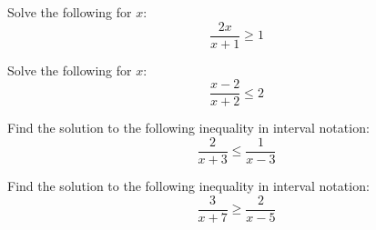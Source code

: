 \vspace{0.5em}

\begin{exercise}
Solve the following for $x$:
\[
\frac{2x}{x+1}\geq1
\]
\end{exercise}
\begin{solution}[3.5in]

\end{solution}

\begin{exercise}
Solve the following for $x$:
\[
\frac{x-2}{x+2}\leq2
\]
\end{exercise}
\begin{solution}[3.5in]

\end{solution}

\begin{exercise}
Find the solution to the following inequality in interval notation:
\[
\frac{2}{x+3}\leq\frac{1}{x-3}
\]
\end{exercise}
\begin{solution}[3.5in]

\end{solution}

\begin{exercise}
Find the solution to the following inequality in interval notation:
\[
\frac{3}{x+7}\geq\frac{2}{x-5}
\]
\end{exercise}
\begin{solution}[3.5in]

\end{solution}

